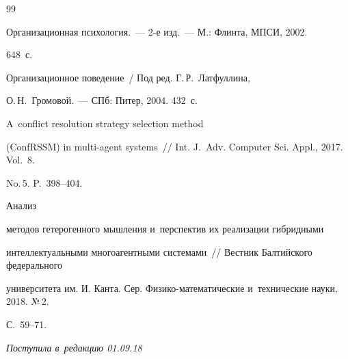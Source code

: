{{\begin{thebibliography}{99}


   Организационная психология.~--- 2-е изд.~--- М.: Флинта, МПСИ, 2002. 


648~с.




  Организационное поведение~/ Под ред. Г.\,Р.~Латфуллина, 


О.\,Н.~Громовой.~--- СПб: Питер, 2004. 432~с.




   A~conflict resolution strategy selection method 


(\mbox{ConfRSSM}) in multi-agent systems~/\!\!/ Int. J.~Adv. Computer Sci. Appl., 2017. Vol.~8. 


No.\,5. P.~398--404.




   Анализ 


методов гетерогенного мышления и~перспектив их реализации гибридными 


интеллектуальными многоагентными системами~/\!\!/ Вестник Балтийского федерального 


университета им. И. Канта. Сер. Физико-математические и~технические науки, 2018. №\,2.


С.~59--71. 








        \end{thebibliography}


} }








\vspace*{-3pt}





\hfill{\small\textit{Поступила в~редакцию 01.09.18}}



















